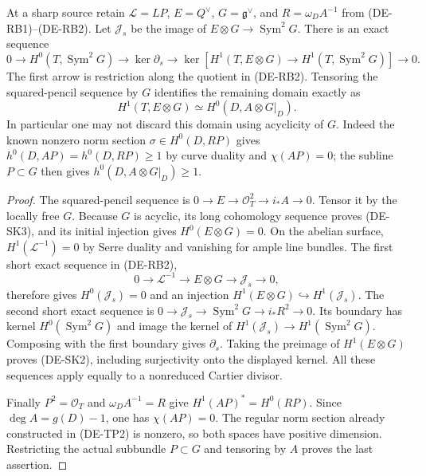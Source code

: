 \begin{lemma}
\label{lem:DE-A3-residual-boundary-kernel}
At a sharp source retain $\mathcal L=LP$, $E=Q^\vee$, $G=\mathfrak g^\vee$,
and $R=\omega_D A^{-1}$ from (DE-RB1)--(DE-RB2).
Let $\mathcal J_s$ be the image of $E\otimes G\to\operatorname{Sym}^2G$.
There is an exact sequence
\[
 0\longrightarrow H^0(T,\operatorname{Sym}^2G)
 \longrightarrow\ker\partial_s
 \longrightarrow
 \ker\!\left[H^1(T,E\otimes G)
       \longrightarrow H^1(T,\operatorname{Sym}^2G)\right]
 \longrightarrow0.
 \tag{DE-SK2}
\]
The first arrow is restriction along the quotient in (DE-RB2).
Tensoring the squared-pencil sequence by $G$ identifies the remaining
domain exactly as
\[
 H^1(T,E\otimes G)\simeq H^0(D,A\otimes G|_D).
 \tag{DE-SK3}
\]
In particular one may not discard this domain using acyclicity of $G$.
Indeed the known nonzero norm section $\sigma\in H^0(D,RP)$ gives
$h^0(D,AP)=h^0(D,RP)\ge1$ by curve duality and $\chi(AP)=0$;
the subline $P\subset G$ then gives
$h^0(D,A\otimes G|_D)\ge1$.
\end{lemma}
\begin{proof}
The squared-pencil sequence is $0\to E\to\mathcal O_T^2\to i_*A\to0$.
Tensor it by the locally free $G$. Because $G$ is acyclic, its long
cohomology sequence proves (DE-SK3), and its initial injection gives
$H^0(E\otimes G)=0$.
On the abelian surface, $H^1(\mathcal L^{-1})=0$ by Serre duality
and vanishing for ample line bundles. The first short exact sequence
in (DE-RB2),
\[
0\to\mathcal L^{-1}\to E\otimes G\to\mathcal J_s\to0,
\]
therefore gives $H^0(\mathcal J_s)=0$ and an injection
$H^1(E\otimes G)\hookrightarrow H^1(\mathcal J_s)$.
The second short exact sequence is
$0\to\mathcal J_s\to\operatorname{Sym}^2G\to i_*R^2\to0$.
Its boundary has kernel $H^0(\operatorname{Sym}^2G)$ and image the
kernel of $H^1(\mathcal J_s)\to H^1(\operatorname{Sym}^2G)$.
Composing with the first boundary gives $\partial_s$. Taking the
preimage of $H^1(E\otimes G)$ proves (DE-SK2), including surjectivity
onto the displayed kernel. All these sequences apply equally to a
nonreduced Cartier divisor.

Finally $P^2=\mathcal O_T$ and $\omega_D A^{-1}=R$ give
$H^1(AP)^*=H^0(RP)$. Since $\deg A=g(D)-1$, one has $\chi(AP)=0$.
The regular norm section already constructed in (DE-TP2) is nonzero,
so both spaces have positive dimension. Restricting the actual
subbundle $P\subset G$ and tensoring by $A$ proves the last assertion.
\end{proof}

